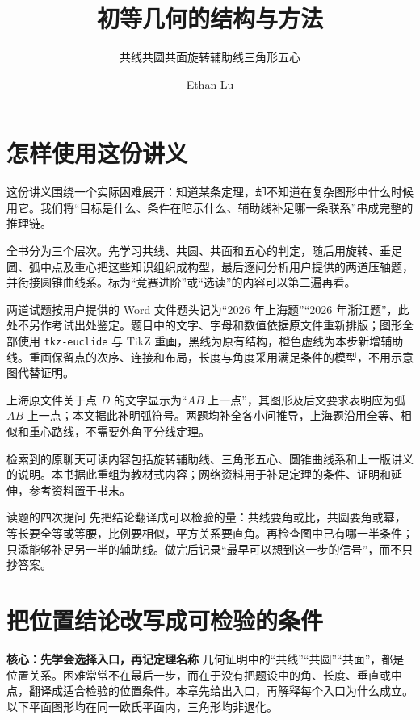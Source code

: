 \documentclass[lang=cn,12pt,fontset=none,a4paper,openany]{beautybook}
\newcommand{\level}[1]{\par\smallskip\noindent\textcolor{coverfgcolor}{\textbf{#1}}\quad}
\begin{document}
\title{初等几何的结构与方法}
\subtitle{共线共圆共面\quad 旋转辅助线\quad 三角形五心}
\author{Ethan Lu}
\hypersetup{pageanchor=false}
\makecover
\frontmatter
\hypersetup{pageanchor=true}
\chapter*{怎样使用这份讲义}
这份讲义围绕一个实际困难展开：知道某条定理，却不知道在复杂图形中什么时候用它。我们将“目标是什么、条件在暗示什么、辅助线补足哪一条联系”串成完整的推理链。

全书分为三个层次。先学习共线、共圆、共面和五心的判定，随后用旋转、垂足圆、弧中点及重心把这些知识组织成构型，最后逐问分析用户提供的两道压轴题，并衔接圆锥曲线系。标为“竞赛进阶”或“选读”的内容可以第二遍再看。

两道试题按用户提供的 Word 文件题头记为“2026 年上海题”“2026 年浙江题”，此处不另作考试出处鉴定。题目中的文字、字母和数值依据原文件重新排版；图形全部使用 \texttt{tkz-euclide} 与 TikZ 重画，黑线为原有结构，橙色虚线为本步新增辅助线。重画保留点的次序、连接和布局，长度与角度采用满足条件的模型，不用示意图代替证明。

上海原文件关于点 $D$ 的文字显示为“$AB$ 上一点”，其图形及后文要求表明应为弧 $AB$ 上一点；本文据此补明弧符号。两题均补全各小问推导，上海题沿用全等、相似和重心路线，不需要外角平分线定理。

检索到的原聊天可读内容包括旋转辅助线、三角形五心、圆锥曲线系和上一版讲义的说明。本书据此重组为教材式内容；网络资料用于补足定理的条件、证明和延伸，参考资料置于书末。

\begin{keybox}{读题的四次提问}
先把结论翻译成可以检验的量：共线要角或比，共圆要角或幂，等长要全等或等腰，比例要相似，平方关系要直角。再检查图中已有哪一半条件；只添能够补足另一半的辅助线。做完后记录“最早可以想到这一步的信号”，而不只抄答案。
\end{keybox}
\tableofcontents
\let\cleardoublepage\clearpage
\mainmatter

\chapter{把位置结论改写成可检验的条件}
\level{核心：先学会选择入口，再记定理名称}
几何证明中的“共线”“共圆”“共面”，都是位置关系。困难常常不在最后一步，而在于没有把题设中的角、长度、垂直或中点，翻译成适合检验的位置条件。本章先给出入口，再解释每个入口为什么成立。以下平面图形均在同一欧氏平面内，三角形均非退化。
\end{document}
